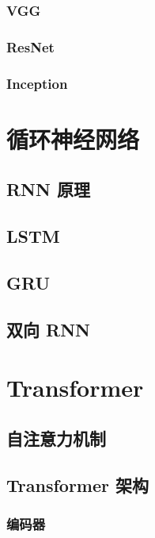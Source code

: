 \documentclass[12pt,UTF8]{ctexbook}
\begin{document}
\subsection{VGG}

\subsection{ResNet}

\subsection{Inception}

\chapter{循环神经网络}
\label{chap:rnn}

\section{RNN 原理}

\section{LSTM}

\section{GRU}

\section{双向 RNN}

\chapter{Transformer}
\label{chap:transformer}

\section{自注意力机制}

\section{Transformer 架构}

\subsection{编码器}
\end{document}
